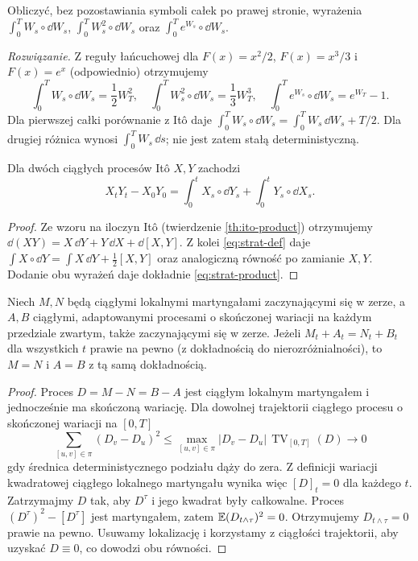 \begin{zadanie}
Obliczyć, bez pozostawiania symboli całek po prawej
stronie, wyrażenia
$\int_0^TW_s\circ\dd W_s$,
$\int_0^TW_s^2\circ\dd W_s$
oraz $\int_0^Te^{W_s}\circ\dd W_s$.

\emph{Rozwiązanie.} Z reguły łańcuchowej dla
$F(x)=x^2/2$, $F(x)=x^3/3$ i $F(x)=e^x$
(odpowiednio) otrzymujemy
\[
\int_0^TW_s\circ\dd W_s=\frac12W_T^2,
\quad \int_0^TW_s^2\circ\dd W_s=\frac13W_T^3,
\quad \int_0^Te^{W_s}\circ\dd W_s=e^{W_T}-1.
\]
Dla pierwszej całki porównanie z Itô daje
$\int_0^T W_s\circ\dd W_s
=\int_0^TW_s\,\dd W_s+T/2$.
Dla drugiej różnica wynosi $\int_0^TW_s\,\dd s$;
nie jest zatem stałą deterministyczną.
\end{zadanie}

\begin{twierdzenie}
Dla dwóch ciągłych procesów Itô $X,Y$ zachodzi
\[
X_tY_t-X_0Y_0
=\int_0^tX_s\circ\dd Y_s+
\int_0^tY_s\circ\dd X_s.
\tag{4.7}\label{eq:strat-product}
\]
\end{twierdzenie}
\begin{proof}
Ze wzoru na iloczyn Itô (twierdzenie
\ref{th:ito-product}) otrzymujemy
$\dd(XY)=X\,\dd Y+Y\,\dd X+\dd[X,Y]$.
Z kolei \eqref{eq:strat-def} daje
$\int X\circ\dd Y=\int X\,\dd Y+\frac12[X,Y]$
oraz analogiczną równość po zamianie $X,Y$.
Dodanie obu wyrażeń daje dokładnie
\eqref{eq:strat-product}.
\end{proof}

\begin{lemat}
\label{lem:uniqueness-mart-fv}
Niech $M,N$ będą ciągłymi lokalnymi martyngałami zaczynającymi się
w zerze, a $A,B$ ciągłymi, adaptowanymi procesami o skończonej
wariacji na każdym przedziale zwartym, także zaczynającymi się
w zerze. Jeżeli $M_t+A_t=N_t+B_t$ dla wszystkich $t$ prawie
na pewno (z dokładnością do nierozróżnialności), to $M=N$ i
$A=B$ z tą samą dokładnością.
\end{lemat}
\begin{proof}
Proces $D=M-N=B-A$ jest ciągłym lokalnym martyngałem
i jednocześnie ma skończoną wariację. Dla dowolnej
trajektorii ciągłego procesu o skończonej wariacji na $[0,T]$
\[
\sum_{[u,v]\in\pi}(D_v-D_u)^2
\le\max_{[u,v]\in\pi}|D_v-D_u|\,\operatorname{TV}_{[0,T]}(D)
\longrightarrow0
\]
gdy średnica deterministycznego podziału dąży do zera.
Z definicji wariacji kwadratowej ciągłego lokalnego
martyngału wynika więc $[D]_t=0$ dla każdego $t$.
Zatrzymajmy $D$ tak, aby $D^\tau$ i jego kwadrat były
całkowalne. Proces $(D^\tau)^2-[D^\tau]$
jest martyngałem, zatem
$\mathbb{E}(D_{t\wedge\tau})^2=0$.
Otrzymujemy $D_{t\wedge\tau}=0$ prawie na pewno.
Usuwamy lokalizację i korzystamy z ciągłości trajektorii,
aby uzyskać $D\equiv0$, co dowodzi obu równości.
\end{proof}

